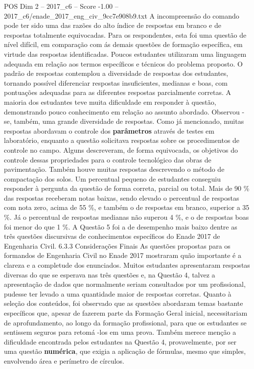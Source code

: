 \begin{textsample}{POS Dim 2 – 2017\_c6 – Score -1.00 – 2017\_c6/enade\_2017\_eng\_civ\_9cc7e908b9.txt}
A incompreensão do comando pode ter sido uma das razões do alto índice de respostas em branco e de respostas totalmente equivocadas.
Para os respondentes, esta foi uma questão de nível difícil, em comparação com ás demais questões de formação específica, em virtude das respostas identificadas.
Poucos estudantes utilizaram uma linguagem adequada em relação aos termos específicos e técnicos do problema proposto.
O padrão de respostas contemplou a diversidade de respostas dos estudantes, tornando possível diferenciar respostas insuficientes, medianas e boas, com pontuações adequadas para as diferentes respostas parcialmente corretas.
A maioria dos estudantes teve muita dificuldade em responder à questão, demonstrando pouco conhecimento em relação ao assunto abordado.
Observou -se, também, uma grande diversidade de respostas.
Como já mencionado, muitas respostas abordavam o controle dos \textbf{parâmetros} através de testes em laboratório, enquanto a questão solicitava respostas sobre os procedimentos de controle no campo.
Alguns descreveram, de forma equivocada, os objetivos do controle dessas propriedades para o controle tecnológico das obras de pavimentação.
Também houve muitas respostas descrevendo o método de compactação dos solos.
Um percentual pequeno de estudantes conseguiu responder à pergunta da questão de forma correta, parcial ou total.
Mais de 90 \% das respostas receberam notas baixas, sendo elevado o percentual de respostas com nota zero, acima de 55 \%, e também o de respostas em branco, superior a 35 \%.
Já o percentual de respostas medianas não superou 4 \%, e o de respostas boas foi menor do que 1 \%.
A Questão 5 foi a de desempenho mais baixo dentre as três questões discursivas de conhecimentos específicos do Enade 2017 de Engenharia Civil. 6.3.3 Considerações Finais As questões propostas para os formandos de Engenharia Civil no Enade 2017 mostraram quão importante é a clareza e a completude dos enunciados.
Muitos estudantes apresentaram respostas diversas do que se esperava nas três questões e, na Questão 4, talvez a apresentação de dados que normalmente seriam consultados por um profissional, pudesse ter levado a uma quantidade maior de respostas corretas.
Quanto à seleção dos conteúdos, foi observado que as questões abordaram temas bastante específicos que, apesar de fazerem parte da Formação Geral inicial, necessitariam de aprofundamento, ao longo da formação profissional, para que os estudantes se sentissem seguros para retomá -los em uma prova.
Também merece menção a dificuldade encontrada pelos estudantes na Questão 4, provavelmente, por ser uma questão \textbf{numérica}, que exigia a aplicação de fórmulas, mesmo que simples, envolvendo área e perímetro de círculos.

\end{textsample}
